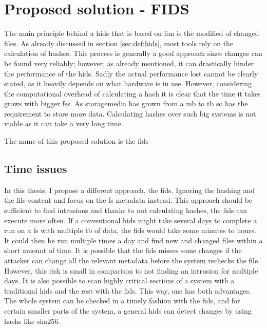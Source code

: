 
\section{Proposed solution - FIDS}
\label{sec:fids}

The main principle behind a \gls{hids} that is based on \gls{fim} is the modified of changed files. As already discussed in section \ref{sec:def:hids}, most tools rely on the calculation of hashes. This process is generally a good approach since changes can be found very reliably; however, as already mentioned, it can drastically hinder the performance of the \gls{hids}. Sadly the actual performance lost cannot be clearly stated, as it heavily depends on what hardware is in use. However, considering the computational overhead of calculating a \gls{hash} it is clear that the time it takes grows with bigger \glspl{fs}. As \gls{storagemedia} has grown from a \gls{mb} to \gls{tb} so has the requirement to store more data. Calculating hashes over such big systems is not viable as it can take a very long time. \cite{hash:slow, hash:veryslow, hash:speed}

The name of this proposed solution is the \gls{fids}

\subsection{Time issues}

In this thesis, I propose a different approach, the \gls{fids}. Ignoring the hashing and the file content and focus on the \gls{fs} \gls{metadata} instead. This approach should be sufficient to find \glspl{intrusion} and thanks to not calculating hashes, the \gls{fids} can execute more often. If a conventional \gls{hids} might take several days to complete a run on a \gls{fs} with multiple \gls{tb} of data, the \gls{fids} would take some minutes to hours. It could then be run multiple times a day and find new and changed files within a short amount of time. It is possible that the \gls{fids} misses some changes if the attacker can change all the relevant \gls{metadata} before the system rechecks the file. However, this risk is small in comparison to not finding an \gls{intrusion} for multiple days. It is also possible to scan highly critical sections of a system with a traditional \gls{hids} and the rest with the \gls{fids}. This way, one has both advantages. The whole system can be checked in a timely fashion with the \gls{fids}, and for certain smaller parts of the system, a general \gls{hids} can detect changes by using \glspl{hash} like \gls{sha256}.

